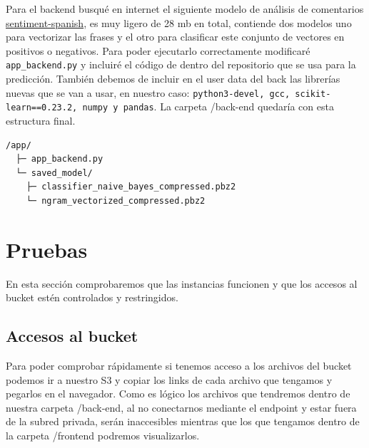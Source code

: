 \documentclass{article}
\begin{document}
	Para el backend busqué en internet el siguiente modelo de análisis de comentarios \href{https://github.com/sentiment-analysis-spanish/sentiment-spanish}{sentiment-spanish}, es muy ligero de 28 mb en total, contiende dos modelos uno para vectorizar las frases y el otro para clasificar este conjunto de vectores en positivos o negativos. Para poder ejecutarlo correctamente modificaré \verb|app_backend.py| y incluiré el código de dentro del repositorio que se usa para la predicción. También debemos de incluir en el user data del back las librerías nuevas que se van a usar, en nuestro caso: \verb|python3-devel, gcc, scikit-learn==0.23.2, numpy y pandas|. La carpeta /back-end quedaría con esta estructura final.

	\begin{lstlisting}[style=consola, language=bash, caption={/back-end}]
 /app/
  ├─ app_backend.py
  └─ saved_model/
    ├─ classifier_naive_bayes_compressed.pbz2
    └─ ngram_vectorized_compressed.pbz2\end{lstlisting}


	\section{Pruebas}

	En esta sección comprobaremos que las instancias funcionen y que los accesos al bucket estén controlados y restringidos.

	\subsection{Accesos al bucket}

	Para poder comprobar rápidamente si tenemos acceso a los archivos del bucket podemos ir a nuestro S3 y copiar los links de cada archivo que tengamos y pegarlos en el navegador. Como es lógico los archivos que tendremos dentro de nuestra carpeta /back-end, al no conectarnos mediante el endpoint y estar fuera de la subred privada, serán inaccesibles mientras que los que tengamos dentro de la carpeta /frontend podremos visualizarlos.
\end{document}
